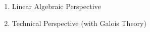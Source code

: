 \documentclass[preview]{standalone}
\begin{document}
\begin{center}
\begin{enumerate} \item Linear Algebraic Perspective \item Technical Perspective (with Galois Theory) \end{enumerate}
\end{center}
\end{document}
